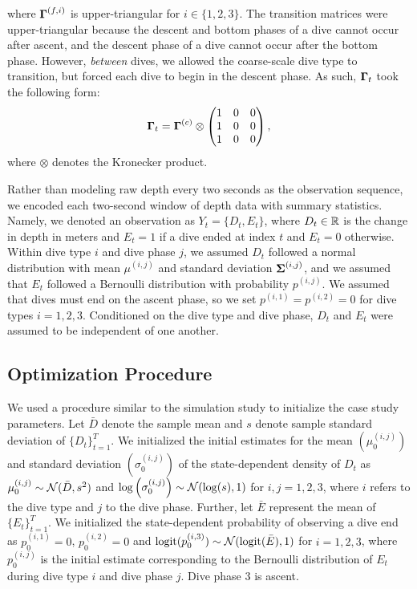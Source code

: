 %
where $\boldsymbol{\Gamma}^{(f,i)}$ is upper-triangular for $i \in \{1,2,3\}$. The transition matrices were upper-triangular because the descent and bottom phases of a dive cannot occur after ascent, and the descent phase of a dive cannot occur after the bottom phase.
%
However, \textit{between} dives, we allowed the coarse-scale dive type to transition, but forced each dive to begin in the descent phase. As such, $\boldsymbol{\Gamma}_t$ took the following form:
%
\begin{equation}
    \boldsymbol{\Gamma}_t = \boldsymbol{\Gamma}^{(c)} \otimes \begin{pmatrix} 1 & 0 & 0 \\ 1 & 0 & 0 \\ 1 & 0 & 0 \end{pmatrix},
\end{equation}
%
where $\otimes$ denotes the Kronecker product.

Rather than modeling raw depth every two seconds as the observation sequence, we encoded each two-second window of depth data with summary statistics. Namely, we denoted an observation as $Y_t = \{D_t,E_t\}$, where $D_t \in \mathbb{R}$ is the change in depth in meters and $E_t = 1$ if a dive ended at index $t$ and $E_t = 0$ otherwise. 
Within dive type $i$ and dive phase $j$, we assumed $D_t$ followed a normal distribution with mean $\mu^{(i,j)}$ and standard deviation $\boldsymbol{\Sigma}^{(i,j)}$, and we assumed that $E_t$ followed a Bernoulli distribution with probability $p^{(i,j)}$. We assumed that dives must end on the ascent phase, so we set $p^{(i,1)} = p^{(i,2)} = 0$ for dive types $i = 1,2,3$. Conditioned on the dive type and dive phase, $D_t$ and $E_t$ were assumed to be independent of one another.

\subsection{Optimization Procedure}

We used a procedure similar to the simulation study to initialize the case study parameters. Let $\bar D$ denote the sample mean and $s$ denote sample standard deviation of $\{D_t\}_{t=1}^T$. We initialized the initial estimates for the mean $\left(\mu^{(i,j)}_0\right)$ and standard deviation $\left(\sigma^{(i,j)}_0\right)$ of the state-dependent density of $D_t$ as
%
    $\mu^{(i,j)}_0 \sim \mathcal{N}(\bar D, s^2)$ and $\log\left(\sigma^{(i,j)}_0\right) \sim \mathcal{N}(\log(s),1)$ for $i,j = 1,2,3$,
%
where $i$ refers to the dive type and $j$ to the dive phase. Further, let $\bar E$ represent the mean of $\{E_t\}_{t=1}^T$. We initialized the state-dependent probability of observing a dive end as
%
    $p^{(i,1)}_0 = 0$, $p^{(i,2)}_0 = 0$ and $\operatorname*{logit}(p^{(i,3)}_0) \sim \mathcal{N}(\operatorname*{logit}(\bar E),1)$ for $i = 1,2,3$,
%
where $p^{(i,j)}_0$ is the initial estimate corresponding to the Bernoulli distribution of $E_t$ during dive type $i$ and dive phase $j$. Dive phase 3 is ascent.

